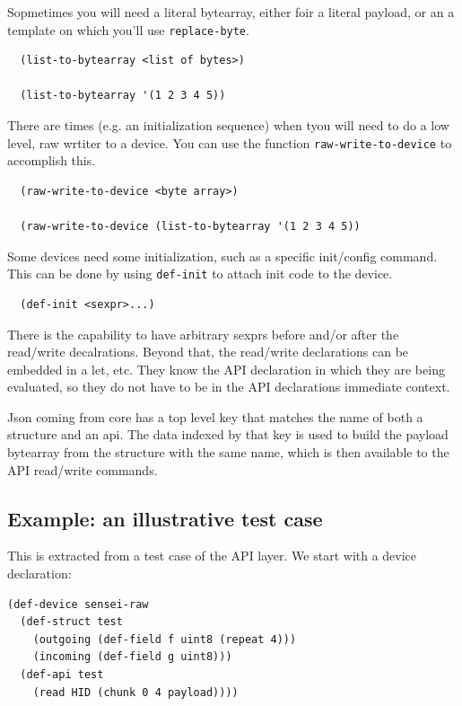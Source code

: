 \documentclass[12pt]{article}
\begin{document}
Sopmetimes you will need a literal bytearray, either foir a literal
payload, or an a template on which you'll use \verb|replace-byte|.

\begin{verbatim}
  (list-to-bytearray <list of bytes>)

  (list-to-bytearray '(1 2 3 4 5))
\end{verbatim}

There are times (e.g. an initialization sequence) when tyou will need
to do a low level, raw wrtiter to a device. You can use the function
\verb|raw-write-to-device| to accomplish this.

\begin{verbatim}
  (raw-write-to-device <byte array>)

  (raw-write-to-device (list-to-bytearray '(1 2 3 4 5))
\end{verbatim}

Some devices need some initialization, such as a specific init/config
command. This can be done by using \verb|def-init| to attach init code
to the device.

\begin{verbatim}
  (def-init <sexpr>...)
\end{verbatim}

There is the capability to have arbitrary sexprs before and/or after
the read/write decalrations. Beyond that, the read/write declarations
can be embedded in a let, etc. They know the API declaration in which
they are being evaluated, so they do not have to be in the API
declarations immediate context.

Json coming from core has a top level key that matches the name of
both a structure and an api. The data indexed by that key is used to
build the payload bytearray from the structure with the same name,
which is then available to the API read/write commands.



\subsection{Example: an illustrative test case}

This is extracted from a test case of the API layer.  We start with a device declaration:

\begin{verbatim}
(def-device sensei-raw 
  (def-struct test 
    (outgoing (def-field f uint8 (repeat 4)))
    (incoming (def-field g uint8)))
  (def-api test
    (read HID (chunk 0 4 payload))))
\end{verbatim}
\end{document}
